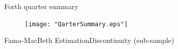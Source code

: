\documentclass{beamer}
\begin{document}
\begin{frame}{Forth quarter summary}\label{Monthly21}
	
	
	
	
	

		\begin{figure}
			\centering  
			\texttt{[image: "QarterSummary.eps"]}
		\end{figure}

	
	
	
\end{frame}		
		
	\begin{frame}{Fama-MacBeth Estimation}{Discontinuity (sub-sample)}
		\label{Monthly9} 

\begin{table}[htbp]
	\centering
	\resizebox{0.8\textwidth}{!}{
		
	}
\end{table}			


		
		
	\end{frame}
	
\end{document}
